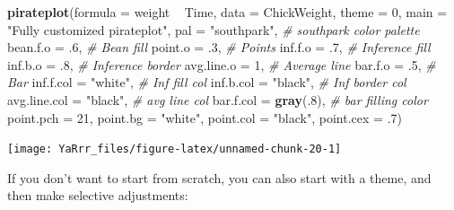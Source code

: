 \documentclass[]{book}
\newenvironment{Shaded}{\begin{snugshade}}{\end{snugshade}}
\newcommand{\KeywordTok}[1]{\textcolor[rgb]{0.13,0.29,0.53}{\textbf{{#1}}}}
\newcommand{\DataTypeTok}[1]{\textcolor[rgb]{0.13,0.29,0.53}{{#1}}}
\newcommand{\DecValTok}[1]{\textcolor[rgb]{0.00,0.00,0.81}{{#1}}}
\newcommand{\StringTok}[1]{\textcolor[rgb]{0.31,0.60,0.02}{{#1}}}
\newcommand{\CommentTok}[1]{\textcolor[rgb]{0.56,0.35,0.01}{\textit{{#1}}}}
\newcommand{\NormalTok}[1]{{#1}}
\theoremstyle{definition}
\theoremstyle{definition}
\theoremstyle{remark}
\begin{document}
\begin{Shaded}
\begin{Highlighting}[]
\KeywordTok{pirateplot}\NormalTok{(}\DataTypeTok{formula =} \NormalTok{weight ~}\StringTok{ }\NormalTok{Time,}
           \DataTypeTok{data =} \NormalTok{ChickWeight,}
           \DataTypeTok{theme =} \DecValTok{0}\NormalTok{,}
           \DataTypeTok{main =} \StringTok{"Fully customized pirateplot"}\NormalTok{,}
           \DataTypeTok{pal =} \StringTok{"southpark"}\NormalTok{, }\CommentTok{# southpark color palette}
           \DataTypeTok{bean.f.o =} \NormalTok{.}\DecValTok{6}\NormalTok{, }\CommentTok{# Bean fill}
           \DataTypeTok{point.o =} \NormalTok{.}\DecValTok{3}\NormalTok{, }\CommentTok{# Points}
           \DataTypeTok{inf.f.o =} \NormalTok{.}\DecValTok{7}\NormalTok{, }\CommentTok{# Inference fill}
           \DataTypeTok{inf.b.o =} \NormalTok{.}\DecValTok{8}\NormalTok{, }\CommentTok{# Inference border}
           \DataTypeTok{avg.line.o =} \DecValTok{1}\NormalTok{, }\CommentTok{# Average line}
           \DataTypeTok{bar.f.o =} \NormalTok{.}\DecValTok{5}\NormalTok{, }\CommentTok{# Bar}
           \DataTypeTok{inf.f.col =} \StringTok{"white"}\NormalTok{, }\CommentTok{# Inf fill col}
           \DataTypeTok{inf.b.col =} \StringTok{"black"}\NormalTok{, }\CommentTok{# Inf border col}
           \DataTypeTok{avg.line.col =} \StringTok{"black"}\NormalTok{, }\CommentTok{# avg line col}
           \DataTypeTok{bar.f.col =} \KeywordTok{gray}\NormalTok{(.}\DecValTok{8}\NormalTok{), }\CommentTok{# bar filling color}
           \DataTypeTok{point.pch =} \DecValTok{21}\NormalTok{,}
           \DataTypeTok{point.bg =} \StringTok{"white"}\NormalTok{,}
           \DataTypeTok{point.col =} \StringTok{"black"}\NormalTok{,}
           \DataTypeTok{point.cex =} \NormalTok{.}\DecValTok{7}\NormalTok{)}
\end{Highlighting}
\end{Shaded}

\begin{center}\texttt{[image: YaRrr\_files/figure-latex/unnamed-chunk-20-1]} \end{center}

If you don't want to start from scratch, you can also start with a
theme, and then make selective adjustments:
\end{document}

